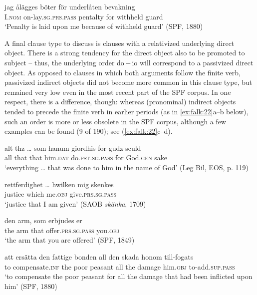 \documentclass[output=paper]{langscibook}
\begin{document}
\ex \label{ex:falk:21b}
\gll jag      ålägges          böter      för    underlåten  bevakning\\
      I.\textsc{nom}  on-lay.\textsc{sg.prs.pass}  pentalty  for    withheld   guard\\
\glt ‘Penalty is laid upon me because of withheld guard’ (SPF, 1880)
\z
\z

A final clause type to discuss is clauses with a relativized underlying direct object. There is a strong tendency for the direct object also to be promoted to subject – thus, the underlying order do\,+\,io will correspond to a passivized direct object. As opposed to clauses in which both arguments follow the finite verb, passivized indirect objects did not become more common in this clause type, but remained very low even in the most recent part of the SPF corpus. In one respect, there is a difference, though: whereas (pronominal) indirect objects tended to precede the finite verb in earlier periods (as in \ref{ex:falk:22}a–b below), such an order is more or less obsolete in the SPF corpus, although a few examples can be found (9 of 190); see (\ref{ex:falk:22}c–d).


\ea%
    \label{ex:falk:22}
\ea\label{ex:falk:22a}
\gll alt  thz …    som  hanum    giordhis          for    gudz      sculd\\
      all  that {}  that  him\textsc{.dat}    do\textsc{.pst.sg.pass}  for    God.\textsc{gen}  sake\\
\glt ‘everything … that was done to him in the name of God’ (Leg Bil, EOS, p. 119)

\ex\label{ex:falk:22b}
\gll rettferdighet … hwilken  mig    skenkes\\
      justice {}      which    me\textsc{.obj}   give\textsc{.prs.sg.pass}\\
\glt ‘justice that I am given’ (SAOB \textit{skänka}, 1709)

\ex\label{ex:falk:22c}
\gll den  arm,  som  erbjudes            er\\
      the  arm  that  offer\textsc{.prs.sg.pass}     you.\textsc{obj}\\
\glt ‘the arm that you are offered’ (SPF, 1849)

\ex\label{ex:falk:22d}
\gll att    ersätta        den  fattige  bonden    all  den  skada    honom till-fogats\\
      to    compensate.\textsc{inf}  the  poor    peasant  all  the  damage  him.\textsc{obj}         to-add\textsc{.sup.pass}\\
\glt ‘to compensate the poor peasant for all the damage that had been inflicted upon       him’ (SPF, 1880)
\z
\z
\end{document}
